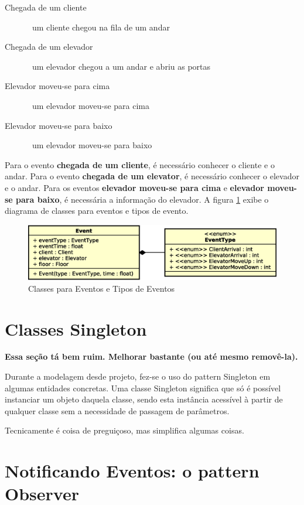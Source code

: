 \begin{description}
  \item[Chegada de um cliente] \hfill \ um cliente chegou na fila de um andar
  \item[Chegada de um elevador] \hfill \ um elevador chegou a um andar e abriu as portas
  \item[Elevador moveu-se para cima] \hfill \ um elevador moveu-se para cima
  \item[Elevador moveu-se para baixo] \hfill \ um elevador moveu-se para baixo
\end{description}

Para o evento \textbf{chegada de um cliente}, é necessário conhecer o cliente e
o andar. Para o evento \textbf{chegada de um elevator}, é necessário conhecer o
elevador e o andar. Para os eventos \textbf{elevador moveu-se para cima} e
\textbf{elevador moveu-se para baixo}, é necessária a informação do elevador. A
figura \ref{fig:diagram:event} exibe o diagrama de classes para eventos e tipos
de evento.

\begin{figure}[htb!]
  \centering
  \includegraphics[scale=0.6]{img/event.eps}
  \caption{Classes para Eventos e Tipos de Eventos}
\label{fig:diagram:event}
\end{figure}

\section{Classes Singleton}

\textbf{Essa seção tá bem ruim. Melhorar bastante (ou até mesmo removê-la).}

Durante a modelagem desde projeto, fez-se o uso do pattern Singleton em algumas
entidades concretas. Uma classe Singleton significa que só é possível instanciar
um objeto daquela classe, sendo esta instância acessível à partir de qualquer
classe sem a necessidade de passagem de parâmetros.

Tecnicamente é coisa de preguiçoso, mas simplifica algumas coisas.

\section{Notificando Eventos: o pattern Observer}

